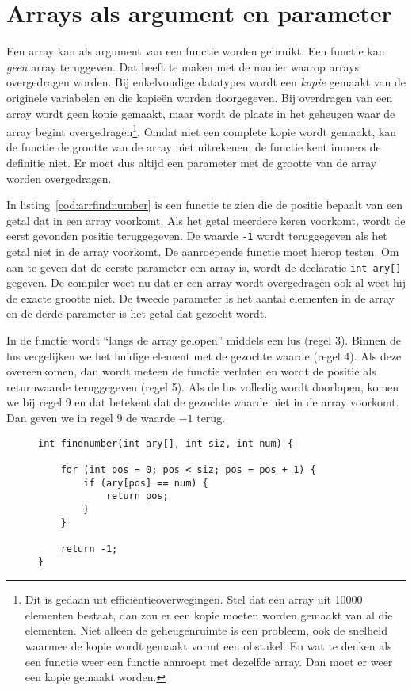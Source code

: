 \section{Arrays als argument en parameter}
Een array kan als argument van een functie worden gebruikt. Een functie kan \textsl{geen} array teruggeven. Dat heeft te maken met de manier waarop arrays overgedragen worden. Bij enkelvoudige datatypes wordt een \textsl{kopie} gemaakt van de originele variabelen en die kopieën worden doorgegeven. Bij overdragen van een array wordt geen kopie gemaakt, maar wordt de plaats in het geheugen waar de array begint overgedragen\footnote{Dit is gedaan uit efficiëntieoverwegingen. Stel dat een array uit 10000 elementen bestaat, dan zou er een kopie moeten worden gemaakt van al die elementen. Niet alleen de geheugenruimte is een probleem, ook de snelheid waarmee de kopie wordt gemaakt vormt een obstakel. En wat te denken als een functie weer een functie aanroept met dezelfde array. Dan moet er weer een kopie gemaakt worden.}. Omdat niet een complete kopie wordt gemaakt, kan de functie de grootte van de array niet uitrekenen; de functie kent immers de definitie niet. Er moet dus altijd een parameter met de grootte van de array worden overgedragen.

In listing~\ref{cod:arrfindnumber} is een functie te zien die de positie bepaalt van een getal dat in een array voorkomt. Als het getal meerdere keren voorkomt, wordt de eerst gevonden positie teruggegeven. De waarde \texttt{-1} wordt teruggegeven als het getal niet in de array voorkomt. De aanroepende functie moet hierop testen. Om aan te geven dat de eerste parameter een array is, wordt de declaratie \texttt{int ary[]} gegeven. De compiler weet nu dat er een array wordt overgedragen ook al weet hij de exacte grootte niet. De tweede parameter is het aantal elementen in de array en de derde parameter is het getal dat gezocht wordt.

In de functie wordt ``langs de array gelopen'' middels een lus (regel 3). Binnen de lus vergelijken we het huidige element met de gezochte waarde (regel 4). Als deze overeenkomen, dan wordt meteen de functie verlaten en wordt de positie als returnwaarde teruggegeven (regel 5). Als de lus volledig wordt doorlopen, komen we bij regel 9 en dat betekent dat de gezochte waarde niet in de array voorkomt. Dan geven we in regel 9 de waarde $-1$ terug.

\begin{figure}[!ht]
\begin{lstlisting}[caption=Functie voor het vinden van een getal in een array.,label=cod:arrfindnumber]
int findnumber(int ary[], int siz, int num) {

    for (int pos = 0; pos < siz; pos = pos + 1) {
        if (ary[pos] == num) {
            return pos;
        }
    }
    
    return -1;
}
\end{lstlisting}
\end{figure}

